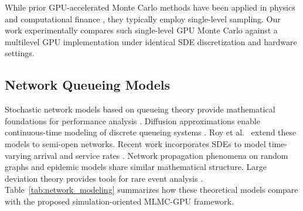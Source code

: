\documentclass{ieeeaccess}
\begin{document}
\begin{table}[t]
\caption{GPU-Accelerated Monte Carlo Methods in Literature}
\label{tab:gpu_lit}
\centering
{}
\end{table}

While prior GPU-accelerated Monte Carlo methods have been applied in physics and computational
finance \cite{nvidia2020cuda, owens2008, harris2007, thompson2010gpu}, they typically employ
single-level sampling. Our work experimentally compares such single-level GPU Monte Carlo against
a multilevel GPU implementation under identical SDE discretization and hardware settings.

\subsection{Network Queueing Models}

Stochastic network models based on queueing theory provide mathematical foundations for
performance analysis \cite{kelly2011stochastic, whitt2002}. Diffusion approximations enable
continuous-time modeling of discrete queueing systems \cite{kang2007, harrison1985}. Roy et al.\
\cite{roy2016} extend these models to semi-open networks. Recent work incorporates SDEs to model
time-varying arrival and service rates \cite{mandelbaum2014stochastic}. Network propagation
phenomena on random graphs \cite{hofstad2016} and epidemic models \cite{kenah2011} share similar
mathematical structure. Large deviation theory provides tools for rare event analysis
\cite{chatterjee2017}. Table~\ref{tab:network_modeling} summarizes how these theoretical models
compare with the proposed simulation-oriented MLMC-GPU framework.
\end{document}
